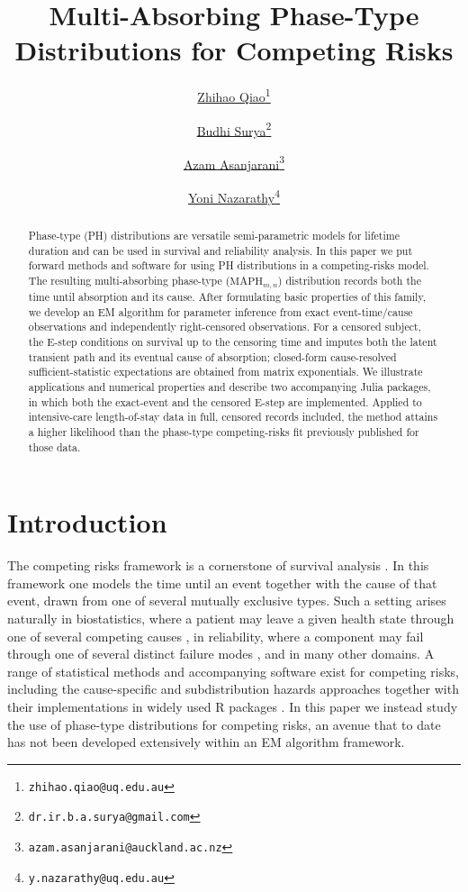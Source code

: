\documentclass{article}
\title{Multi-Absorbing Phase-Type Distributions for \subchg{Right-Censored} Competing Risks \subchg{Data}}
\author[1]{%
	\href{https://orcid.org/0000-0000-0000-0000}{\usebox{\orcid}\hspace{1mm}Zhihao Qiao\thanks{\texttt{zhihao.qiao@uq.edu.au}}}%
}
\author[2]{%
	\href{https://orcid.org/0000-0000-0000-0000}{\usebox{\orcid}\hspace{1mm}Budhi Surya\thanks{\texttt{dr.ir.b.a.surya@gmail.com}}}%
}
\author[3]{%
	\href{https://orcid.org/0000-0000-0000-0000}{\usebox{\orcid}\hspace{1mm}Azam Asanjarani\thanks{\texttt{azam.asanjarani@auckland.ac.nz}}}%
}
\author[1]{%
	\href{https://orcid.org/0000-0000-0000-0000}{\usebox{\orcid}\hspace{1mm}Yoni Nazarathy\thanks{\texttt{y.nazarathy@uq.edu.au}}}%
}
\affil[1]{School of Mathematics and Physics, University of Queensland, St Lucia, Queensland}
\affil[2]{School of Mathematics and Statistics, Victoria University of Wellington, New Zealand}
\affil[3]{Faculty of Science, Statistics, University of Auckland, New Zealand}
\newenvironment{rcrevision}{}{}
\newcommand{\aachg}[1]{#1}
\newcommand{\subchg}[1]{#1}
\begin{document}
\maketitle


\begin{abstract}
\begin{rcrevision}
Phase-type (PH) distributions are versatile semi-parametric models for lifetime duration and can be used in survival and reliability analysis. In this paper we put forward methods and software for using PH distributions in a competing-risks model. The resulting multi-absorbing phase-type ($\text{MAPH}_{m,n}$) distribution records both the time until absorption and its cause. After formulating basic properties of this family, we develop \subchg{an} EM algorithm for parameter inference from exact event-time/cause observations and independently right-censored observations. For a censored subject, the E-step conditions on survival \aachg{up to} the censoring time and imputes both the latent transient path and its eventual \aachg{cause of absorption}; closed-form cause-resolved sufficient-statistic expectations are obtained from matrix exponentials. We illustrate applications and numerical properties and describe two accompanying Julia packages, in which both the exact-event and the censored E-step are implemented. Applied to intensive-care length-of-stay data in full, censored records included, the method attains a higher likelihood than the phase-type competing-risks fit previously published for those data.
\end{rcrevision}
\end{abstract}


\begin{rcrevision}
\end{rcrevision}

\section{Introduction}

The competing risks framework is a cornerstone of survival analysis \citep{kalbfleisch_prentice_2002, crowder_2001, beyersmann_2012}. In this framework one models the time until an event together with the cause of that event, drawn from one of several mutually exclusive types. Such a setting arises naturally in biostatistics, where a patient may leave a given health state through one of several competing causes \citep{putter_2007, austin_2016}, in reliability, where a component may fail through one of several distinct failure modes \citep{crowder_2001, meeker_escobar_1998}, and in many other domains. A range of statistical methods and accompanying software exist for competing risks, including the cause-specific and subdistribution hazards approaches \citep{fine_gray_1999} together with their implementations in widely used \textsf{R} packages \citep{dewreede_2011, therneau_survival}. In this paper we instead study the use of phase-type distributions for competing risks, an avenue that to date has not been developed extensively within an EM algorithm framework.
\end{document}
